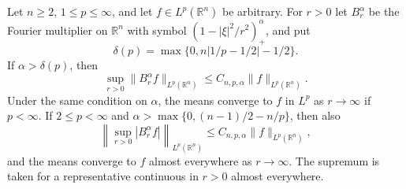 Let $n\ge 2$, $1\le p\le\infty$, and let $f\in L^p(\mathbb R^n)$ be arbitrary. For $r>0$ let $B_r^\alpha$ be the Fourier multiplier on $\mathbb R^n$ with symbol $(1-|\xi|^2/r^2)_+^\alpha$, and put
\[
\delta(p)=\max\{0,n|1/p-1/2|-1/2\}.
\]
If $\alpha>\delta(p)$, then
\[
\sup_{r>0}\|B_r^\alpha f\|_{L^p(\mathbb R^n)}
\le C_{n,p,\alpha}\|f\|_{L^p(\mathbb R^n)}.
\]
Under the same condition on $\alpha$, the means converge to $f$ in $L^p$ as $r\to\infty$ if $p<\infty$. If $2\le p<\infty$ and $\alpha>\max\{0,(n-1)/2-n/p\}$, then also
\[
\left\|\sup_{r>0}|B_r^\alpha f|\right\|_{L^p(\mathbb R^n)}
\le C_{n,p,\alpha}\|f\|_{L^p(\mathbb R^n)},
\]
and the means converge to $f$ almost everywhere as $r\to\infty$. The supremum is taken for a representative continuous in $r>0$ almost everywhere.
